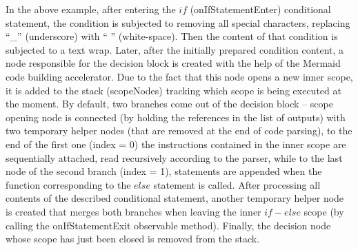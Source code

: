 In the above example, after entering the $if$ (onIfStatementEnter) conditional statement, the condition is subjected to removing all special characters, replacing ``\_'' (underscore) with `` '' (white-space). Then the content of that condition is subjected to a text wrap. Later, after the initially prepared condition content, a node responsible for the decision block is created with the help of the Mermaid code building accelerator. Due to the fact that this node opens a new inner scope, it is added to the stack (scopeNodes) tracking which scope is being executed at the moment. By default, two branches come out of the decision block -- scope opening node is connected (by holding the references in the list of outputs) with two temporary helper nodes (that are removed at the end of code parsing), to the end of the first one (index = 0) the instructions contained in the inner scope are sequentially attached, read recursively according to the parser, while to the last node of the second branch (index = 1), statements are appended when the function corresponding to the $else$ statement is called. After processing all contents of the described conditional statement, another temporary helper node is created that merges both branches when leaving the inner $if-else$ scope (by calling the onIfStatementExit observable method). Finally, the decision node whose scope has just been closed is removed from the stack.